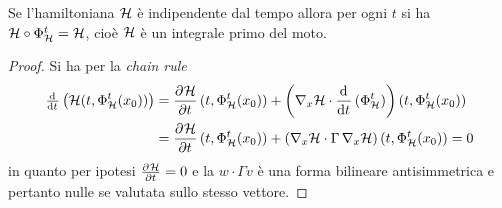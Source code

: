 \begin{thm}
    Se l'hamiltoniana $ \mathcal{H} $ è indipendente dal tempo allora per ogni $ t $ si ha $ \mathcal{H} \circ \Phi_{\mathcal{H}}^t = \mathcal{H} $, cioè $ \mathcal{H} $ è un integrale primo del moto.
\end{thm}
\begin{proof}
    Si ha per la \emph{chain rule}
    \begin{align*}
        \od{}{t} \left( \ham(t, \Phi_\ham^t(x_0))\right) & = \dpd{\ham}{t}(t, \Phi_\ham^t(x_0)) + \left(\nabla_x \ham \cdot \dod{}{t}(\Phi^t_\ham)\right)(t, \Phi^t_\ham(x_0)) \\
        & = \dpd{\ham}{t}(t, \Phi_\ham^t(x_0)) + \left(\nabla_x \ham \cdot \Gamma \, \nabla_x \ham\right)(t, \Phi^t_\ham(x_0)) = 0
    \end{align*}
    in quanto per ipotesi $ \pd{\ham}{t} = 0 $ e la $ w \cdot \Gamma v $ è una forma bilineare antisimmetrica e pertanto nulle se valutata sullo stesso vettore.
\end{proof}